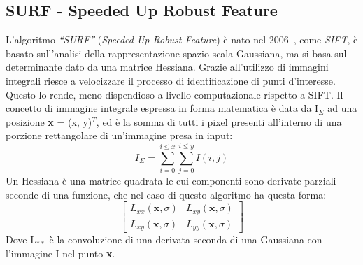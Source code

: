 \subsection{SURF - Speeded Up Robust Feature}
L'algoritmo \textit{``SURF''} (\textit{Speeded Up Robust Feature}) è nato nel 2006~\cite{BAY2008346}, come \textit{SIFT}, è basato sull'analisi della rappresentazione spazio-scala Gaussiana, ma si basa sul determinante dato da una matrice Hessiana. Grazie all'utilizzo di immagini integrali riesce a velocizzare il processo di identificazione di punti d'interesse. Questo lo rende, meno dispendioso a livello computazionale rispetto a SIFT.\hfill \break
\noindent Il concetto di immagine integrale espressa in forma matematica è data da I\(_{\Sigma}\) ad una posizione \textbf{x} = (x, y)\(^{T}\), ed è la somma di tutti i pixel presenti all'interno di una porzione rettangolare di un'immagine presa in input:
\begin{equation}
	I_{\Sigma} = \sum^{i \leq x}_{i=0} \sum^{i \leq y}_{j=0} I (i, j)
\end{equation}
\noindent Un Hessiana è una matrice quadrata le cui componenti sono derivate parziali seconde di una funzione, che nel caso di questo algoritmo ha questa forma:
\begin{equation}
	\begin{bmatrix}
		L_{xx}(\textbf{x}, \sigma) & L_{xy}(\textbf{x}, \sigma) \\
		L_{xy}(\textbf{x}, \sigma) & L_{yy}(\textbf{x}, \sigma)
	\end{bmatrix}
\end{equation}
\noindent Dove L\(_{**}\) è la convoluzione di una derivata seconda di una Gaussiana con l'immagine I nel punto \textbf{x}.
